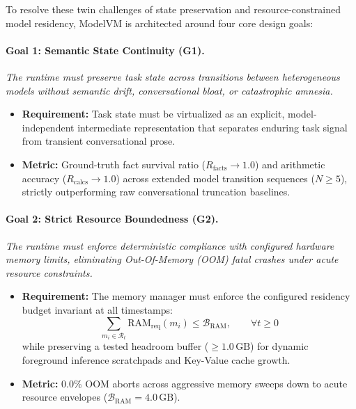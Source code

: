 To resolve these twin challenges of state preservation and resource-constrained model residency, ModelVM is architected around four core design goals:

\paragraph{Goal 1: Semantic State Continuity (G1).}
\textit{The runtime must preserve task state across transitions between heterogeneous models without semantic drift, conversational bloat, or catastrophic amnesia.}
\begin{itemize}
    \item \textbf{Requirement:} Task state must be virtualized as an explicit, model-independent intermediate representation that separates enduring task signal from transient conversational prose.
    \item \textbf{Metric:} Ground-truth fact survival ratio ($R_{\text{facts}} \to 1.0$) and arithmetic accuracy ($R_{\text{calcs}} \to 1.0$) across extended model transition sequences ($N \ge 5$), strictly outperforming raw conversational truncation baselines.
\end{itemize}

\paragraph{Goal 2: Strict Resource Boundedness (G2).}
\textit{The runtime must enforce deterministic compliance with configured hardware memory limits, eliminating Out-Of-Memory (OOM) fatal crashes under acute resource constraints.}
\begin{itemize}
    \item \textbf{Requirement:} The memory manager must enforce the configured residency budget invariant at all timestamps:
    \begin{equation}
    \sum_{m_i \in \mathcal{R}_t} \text{RAM}_{\text{req}}(m_i) \le \mathcal{B}_{\text{RAM}}, \qquad \forall t \ge 0
    \end{equation}
    while preserving a tested headroom buffer ($\ge 1.0\,\text{GB}$) for dynamic foreground inference scratchpads and Key-Value cache growth.
    \item \textbf{Metric:} 0.0\% OOM aborts across aggressive memory sweeps down to acute resource envelopes ($\mathcal{B}_{\text{RAM}} = 4.0\,\text{GB}$).
\end{itemize}

